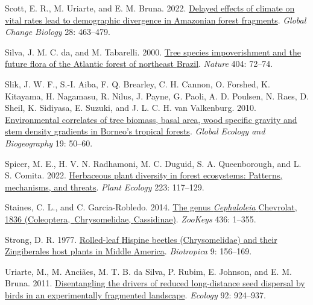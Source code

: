 \documentclass[
  12pt,
  man, donotrepeattitle,floatsintext]{apa6}
\newlength{\cslhangindent}
\newlength{\cslentryspacingunit} %
\newenvironment{CSLReferences}[2] %
 {%
  \setlength{\parindent}{0pt}
  \ifodd #1
  \let\oldpar\par
  \def\par{\hangindent=\cslhangindent\oldpar}
  \fi
  \setlength{\parskip}{#2\cslentryspacingunit}
 }%
 {}
\begin{document}
\begin{CSLReferences}{1}{0}
\leavevmode{}%
Scott, E. R., M. Uriarte, and E. M. Bruna. 2022. \href{https://doi.org/10.1111/gcb.15900}{Delayed effects of climate on vital rates lead to demographic divergence in {Amazonian} forest fragments}. \emph{Global Change Biology} 28: 463--479.

\leavevmode{}%
Silva, J. M. C. da, and M. Tabarelli. 2000. \href{https://doi.org/10.1038/35003563}{Tree species impoverishment and the future flora of the {Atlantic} forest of northeast {Brazil}}. \emph{Nature} 404: 72--74.

\leavevmode{}%
Slik, J. W. F., S.-I. Aiba, F. Q. Brearley, C. H. Cannon, O. Forshed, K. Kitayama, H. Nagamasu, R. Nilus, J. Payne, G. Paoli, A. D. Poulsen, N. Raes, D. Sheil, K. Sidiyasa, E. Suzuki, and J. L. C. H. van Valkenburg. 2010. \href{https://doi.org/10.1111/j.1466-8238.2009.00489.x}{Environmental correlates of tree biomass, basal area, wood specific gravity and stem density gradients in {Borneo}'s tropical forests}. \emph{Global Ecology and Biogeography} 19: 50--60.

\leavevmode{}%
Spicer, M. E., H. V. N. Radhamoni, M. C. Duguid, S. A. Queenborough, and L. S. Comita. 2022. \href{https://doi.org/10.1007/s11258-021-01202-9}{Herbaceous plant diversity in forest ecosystems: Patterns, mechanisms, and threats}. \emph{Plant Ecology} 223: 117--129.

\leavevmode{}%
Staines, C. L., and C. Garcia-Robledo. 2014. \href{https://doi.org/10.3897/zookeys.436.5766}{The genus \emph{{Cephaloleia}} {Chevrolat}, 1836 ({Coleoptera},~{Chrysomelidae}, {Cassidinae})}. \emph{ZooKeys} 436: 1--355.

\leavevmode{}%
Strong, D. R. 1977. \href{https://doi.org/10.2307/2387878}{Rolled-leaf {Hispine} beetles ({Chrysomelidae}) and their {Zingiberales} host plants in {Middle} {America}}. \emph{Biotropica} 9: 156--169.

\leavevmode{}%
Uriarte, M., M. Anciães, M. T. B. da Silva, P. Rubim, E. Johnson, and E. M. Bruna. 2011. \href{https://doi.org/10.1890/10-0709.1}{Disentangling the drivers of reduced long-distance seed dispersal by birds in an experimentally fragmented landscape}. \emph{Ecology} 92: 924--937.


\end{CSLReferences}
\end{document}
